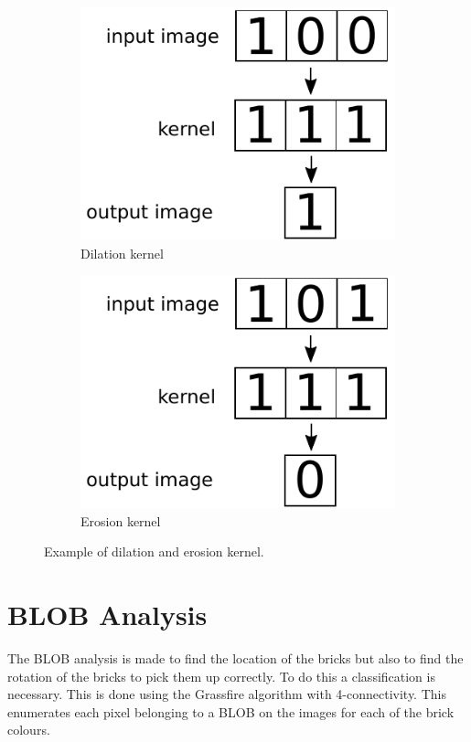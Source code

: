 \begin{figure}
	\centering
	\begin{subfigure}[b]{0.45\textwidth}
		\includegraphics[width=\textwidth]{figures/dilation}
		\caption{Dilation kernel}
		\label{fig:dilation}
	\end{subfigure}
	\begin{subfigure}[b]{0.45\textwidth}
		\includegraphics[width=\textwidth]{figures/erosion}
		\caption{Erosion kernel}
		\label{fig:erosion}
	\end{subfigure}
	\caption{Example of dilation and erosion kernel.}
	\label{fig:dil_eros}
\end{figure}

\section{BLOB Analysis}
The BLOB analysis is made to find the location of the bricks but also to find the rotation of the bricks to pick them up correctly. To do this a classification is necessary. This is done using the Grassfire algorithm with 4-connectivity. This enumerates each pixel belonging to a BLOB on the images for each of the brick colours.

